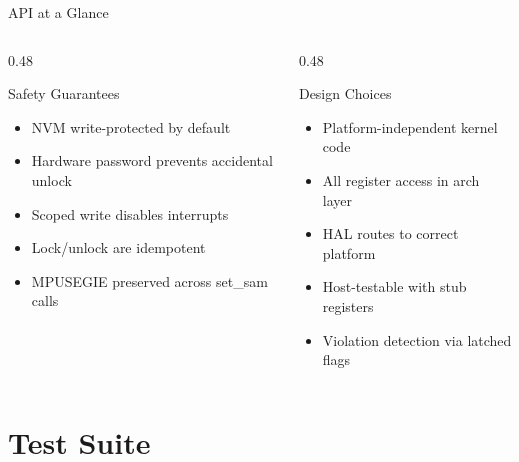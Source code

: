 \documentclass[aspectratio=169, 10pt]{beamer}
\begin{document}
\begin{frame}{API at a Glance}
\vspace{0.5em}
\begin{columns}[T]
\begin{column}{0.48\textwidth}
\begin{block}{Safety Guarantees}
\begin{itemize}
  \item NVM write-protected by default
  \item Hardware password prevents accidental unlock
  \item Scoped write disables interrupts
  \item Lock/unlock are idempotent
  \item MPUSEGIE preserved across set\_sam calls
\end{itemize}
\end{block}
\end{column}
\begin{column}{0.48\textwidth}
\begin{block}{Design Choices}
\begin{itemize}
  \item Platform-independent kernel code
  \item All register access in arch layer
  \item HAL routes to correct platform
  \item Host-testable with stub registers
  \item Violation detection via latched flags
\end{itemize}
\end{block}
\end{column}
\end{columns}
\end{frame}

\section{Test Suite}
\end{document}
